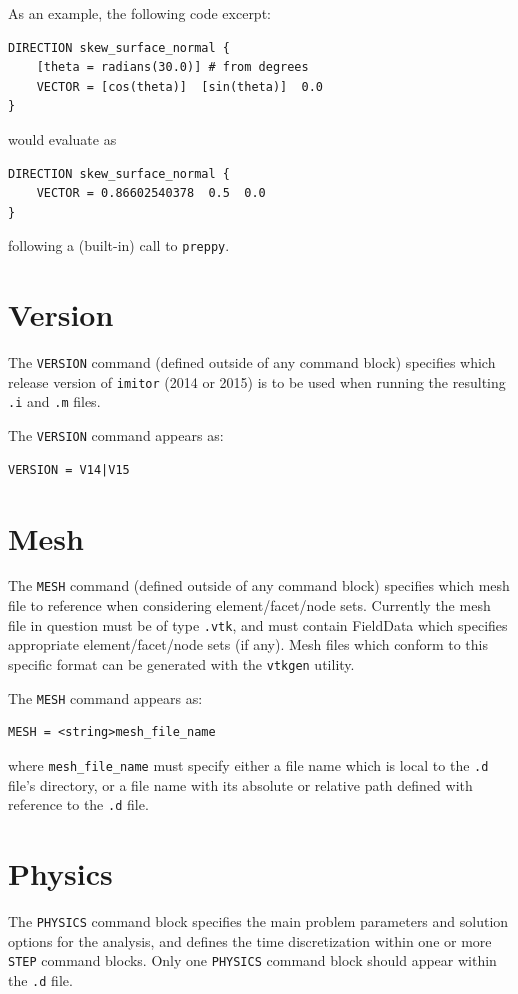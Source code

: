 \documentclass[11pt]{article} %
\begin{document}
As an example, the following code excerpt:
\begin{lstlisting}
DIRECTION skew_surface_normal {
	[theta = radians(30.0)] # from degrees
	VECTOR = [cos(theta)]  [sin(theta)]  0.0
}
\end{lstlisting}
would evaluate as
\begin{lstlisting}
DIRECTION skew_surface_normal {
	VECTOR = 0.86602540378  0.5  0.0
}
\end{lstlisting}
following a (built-in) call to \texttt{preppy}.

\section{Version} The \texttt{VERSION} command (defined outside of any command block) specifies which release version of \texttt{imitor} (2014 or 2015) is to be used when running the resulting \texttt{.i} and \texttt{.m} files.

The \texttt{VERSION} command appears as:
\begin{lstlisting}
VERSION = V14|V15
\end{lstlisting}

\section{Mesh} The \texttt{MESH} command (defined outside of any command block) specifies which mesh file to reference when considering element/facet/node sets. Currently the mesh file in question must be of type \texttt{.vtk}, and must contain FieldData which specifies appropriate element/facet/node sets (if any). Mesh files which conform to this specific format can be generated with the \texttt{vtkgen} utility.

The \texttt{MESH} command appears as:
\begin{lstlisting}
MESH = <string>mesh_file_name
\end{lstlisting}
where \texttt{mesh\_file\_name} must specify either a file name which is local to the \texttt{.d} file's directory, or a file name with its absolute or relative path defined with reference to the \texttt{.d} file.

\section{Physics} \label{physics_section} The \texttt{PHYSICS} command block specifies the main problem parameters and solution options for the analysis, and defines the time discretization within one or more \texttt{STEP} command blocks. Only one \texttt{PHYSICS} command block should appear within the \texttt{.d} file.
\end{document}
